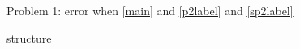 Problem 1: error when \ref{main} and \ref{p2label} and \ref{sp2label}
\cite{test}

\label{p1label}

{structure}

